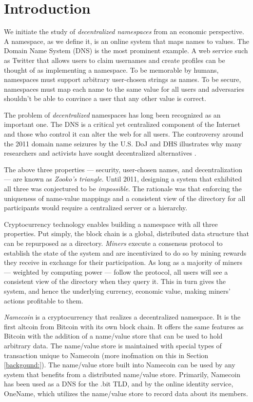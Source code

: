\section{Introduction}
\label{sec:intro}

We initiate the study of {\em decentralized namespaces} from an economic perspective. A namespace, as we define it, is an online system that maps names to values. The Domain Name System (DNS) is the most prominent example.  A web service such as Twitter that allows users to claim usernames and create profiles can be thought of as implementing a namespace. To be memorable by humans, namespaces must support arbitrary user-chosen strings as names. To be secure, namespaces must map each name to the same value for all users and adversaries shouldn't be able to convince a user that any other value is correct.

The problem of {\em decentralized} namespaces has long been recognized as an important one. The DNS is a critical yet centralized component of the Internet and those who control it can alter the web for all users. The controversy around the 2011 domain name seizures by the U.S. DoJ and DHS illustrates why many researchers and activists have sought decentralized alternatives \cite{wikileaks}.

The above three properties --- security, user-chosen names, and decentralization --- are known as {\em Zooko's triangle}. Until 2011, designing a system that exhibited all three was conjectured to be {\em impossible}. The rationale was that enforcing the uniqueness of name-value mappings and a consistent view of the directory for all participants would require a centralized server or a hierarchy.

Cryptocurrency technology enables building a namespace with all three properties. Put simply, the block chain is a global, distributed data structure that can be repurposed as a directory. {\em Miners} execute a consensus protocol to establish the state of the system and are incentivized to do so by mining rewards they receive in exchange for their participation. As long as a majority of miners --- weighted by computing power --- follow the protocol, all users will see a consistent view of the directory when they query it. This in turn gives the system, and hence the underlying currency, economic value, making miners' actions profitable to them.

{\em Namecoin} is a cryptocurrency that realizes a decentralized namespace. It is the first altcoin from Bitcoin with its own block chain. It offers the same features as Bitcoin with the addition of a name/value store that can be used to hold arbitrary data. The name/value store is maintained with special types of transaction unique to Namecoin (more inofmation on this in Section \ref{backgound:}). The name/value store built into Namecoin can be used by any system that benefits from a distributed name/value store. Primarily, Namecoin has been used as a DNS for the .bit TLD, and by the online identity service, OneName, which utilizes the name/value store to record data about its members.

